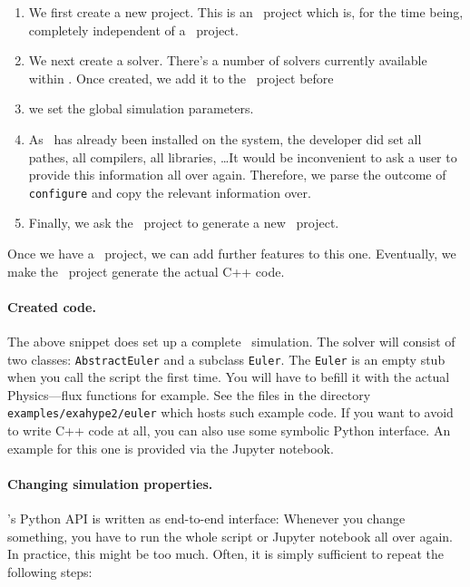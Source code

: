 \begin{enumerate}
  \item We first create a new project. This is an \ExaHyPE\ project which is,
  for the time being, completely independent of a \Peano\ project.
  \item We next create a solver. 
  There's a number of solvers currently available within \ExaHyPE.
  Once created, we add it to the \ExaHyPE\ project before 
  \item we set the global simulation parameters.
  \item As \Peano\ has already been installed on the system, the developer did
  set all pathes, all compilers, all libraries, \ldots It would be inconvenient
  to ask a user to provide this information all over again. Therefore, we parse
  the outcome of \texttt{configure} and copy the relevant information over.
  \item Finally, we ask the \ExaHyPE\ project to generate a new \Peano\ project. 
\end{enumerate}


\noindent
Once we have a \Peano\ project, we can add further features to this one.
Eventually, we make the \Peano\ project generate the actual C++ code.


\paragraph{Created code.}
The above snippet does set up a complete \ExaHyPE\ simulation.
The solver will consist of two classes: \texttt{AbstractEuler} and a subclass
\texttt{Euler}.
The \texttt{Euler} is an empty stub when you call the script the first time.
You will have to befill it with the actual Physics---flux functions for example.
See the files in the directory \texttt{examples/exahype2/euler} which hosts such
example code. 
If you want to avoid to write C++ code at all, you can also use some symbolic
Python interface. 
An example for this one is provided via the Jupyter notebook.


\paragraph{Changing simulation properties.}
\ExaHyPE's Python API is written as end-to-end interface:
Whenever you change something, you have to run the whole script or Jupyter
notebook all over again.
In practice, this might be too much. 
Often, it is simply sufficient to repeat the following steps:

